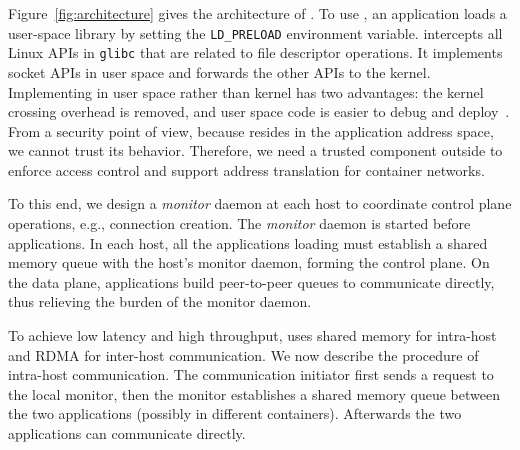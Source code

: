 
Figure~\ref{fig:architecture} gives the architecture of \sys. To use \sys, an application loads a user-space library \libipc{} by setting the \texttt{LD\_PRELOAD} environment variable. \libipc{} intercepts all Linux APIs in \texttt{glibc} that are related to file descriptor operations. It implements socket APIs in user space and forwards the other APIs to the kernel.
Implementing \sys in user space rather than kernel has two advantages: the kernel crossing overhead is removed, and user space code is easier to debug and deploy~\cite{andromeda}.
From a security point of view, because \libipc{} resides in the application address space, we cannot trust its behavior. Therefore, we need a trusted component outside \libipc{} to enforce access control and support address translation for container networks.

To this end, we design a \emph{monitor} daemon at each host to coordinate control plane operations, e.g., connection creation. The \emph{monitor} daemon is started before applications. In each host, all the applications loading \libipc{} must establish a shared memory queue with the host's monitor daemon, forming the control plane. On the data plane, applications build peer-to-peer queues to communicate directly, thus relieving the burden of the monitor daemon.




To achieve low latency and high throughput, \sys{} uses shared memory for intra-host and RDMA for inter-host communication. We now describe the procedure of intra-host communication. The communication initiator first sends a request to the local monitor, then the monitor establishes a shared memory queue between the two applications (possibly in different containers). Afterwards the two applications can communicate directly.  



